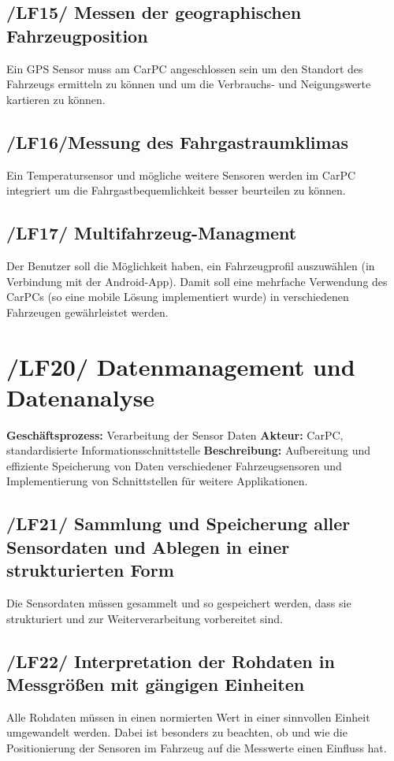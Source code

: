 \subsection{/LF15/ Messen der geographischen Fahrzeugposition}
Ein GPS Sensor muss am CarPC angeschlossen sein um den Standort des Fahrzeugs ermitteln zu können und um die Verbrauchs- und Neigungswerte kartieren zu können.

\subsection{/LF16/Messung des Fahrgastraumklimas}
Ein Temperatursensor und mögliche weitere Sensoren werden im CarPC integriert um die Fahrgastbequemlichkeit besser beurteilen zu können.

\subsection{/LF17/ Multifahrzeug-Managment}
Der Benutzer soll die Möglichkeit haben, ein Fahrzeugprofil auszuwählen (in Verbindung mit der Android-App). Damit soll eine mehrfache Verwendung des CarPCs (so eine mobile Lösung implementiert wurde) in verschiedenen Fahrzeugen gewährleistet werden.

\newpage

\section{/LF20/ Datenmanagement und Datenanalyse}
\textbf{Geschäftsprozess:}	Verarbeitung der Sensor Daten
\newline
\textbf{Akteur:}		CarPC, standardisierte Informationsschnittstelle
\newline
\textbf{Beschreibung:} Aufbereitung und effiziente Speicherung von Daten verschiedener Fahrzeugsensoren und Implementierung von Schnittstellen für weitere Applikationen. 

\subsection{/LF21/ Sammlung und Speicherung aller Sensordaten und Ablegen in einer strukturierten Form}
Die Sensordaten müssen gesammelt und so gespeichert werden, dass sie strukturiert und zur Weiterverarbeitung vorbereitet sind.

\subsection{/LF22/ Interpretation der Rohdaten in Messgrößen mit gängigen Einheiten}
Alle Rohdaten müssen in einen normierten Wert in einer sinnvollen Einheit umgewandelt werden. Dabei ist besonders zu beachten, ob und wie die Positionierung der Sensoren im Fahrzeug auf die Messwerte einen Einfluss hat.

